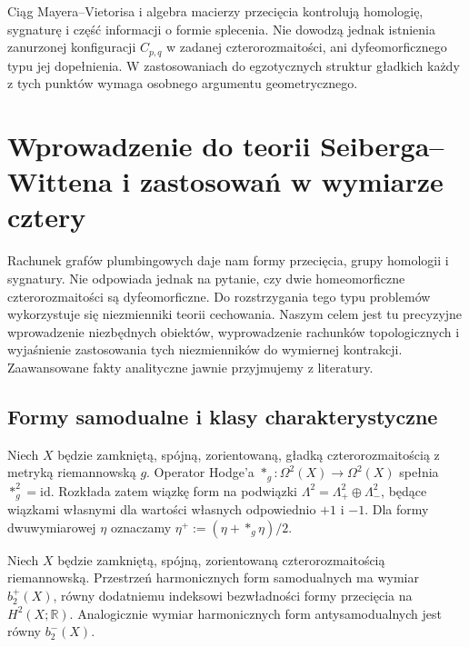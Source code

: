 \begin{uwaga}
Ciąg Mayera--Vietorisa i algebra macierzy przecięcia
kontrolują homologię, sygnaturę i część informacji
o formie splecenia. Nie dowodzą jednak istnienia
zanurzonej konfiguracji $C_{p,q}$ w zadanej
czterorozmaitości, ani dyfeomorficznego typu jej
dopełnienia. W zastosowaniach do egzotycznych struktur
gładkich każdy z tych punktów wymaga osobnego
argumentu geometrycznego.
\end{uwaga}

\chapter{Wprowadzenie do teorii Seiberga--Wittena i zastosowań w wymiarze cztery}
\label{ch:tg-sw}

Rachunek grafów plumbingowych daje nam formy przecięcia,
grupy homologii i sygnatury. Nie odpowiada jednak na pytanie,
czy dwie homeomorficzne czterorozmaitości są dyfeomorficzne.
Do rozstrzygania tego typu problemów wykorzystuje się
niezmienniki teorii cechowania. Naszym celem jest tu
precyzyjne wprowadzenie niezbędnych obiektów, wyprowadzenie
rachunków topologicznych i wyjaśnienie zastosowania tych
niezmienników do wymiernej kontrakcji. Zaawansowane
fakty analityczne jawnie przyjmujemy z literatury.

\section{Formy samodualne i klasy charakterystyczne}
\label{sec:tg-sw-selfdual}

Niech $X$ będzie zamkniętą, spójną, zorientowaną,
gładką czterorozmaitością z metryką riemannowską $g$.
Operator Hodge'a $*_g:\Omega^2(X)\to\Omega^2(X)$ spełnia
$*_g^2=\mathrm{id}$. Rozkłada zatem wiązkę form na podwiązki
$\Lambda^2=\Lambda^2_+\oplus\Lambda^2_-$, będące wiązkami
własnymi dla wartości własnych odpowiednio $+1$ i $-1$.
Dla formy dwuwymiarowej $\eta$ oznaczamy
$\eta^+:=(\eta+*_g\eta)/2$.

\begin{stwierdzenie}
Niech $X$ będzie zamkniętą, spójną, zorientowaną
czterorozmaitością riemannowską. Przestrzeń harmonicznych
form samodualnych ma wymiar $b_2^+(X)$, równy dodatniemu
indeksowi bezwładności formy przecięcia na $H^2(X;\mathbb R)$.
Analogicznie wymiar harmonicznych form antysamodualnych
jest równy $b_2^-(X)$.
\end{stwierdzenie}

